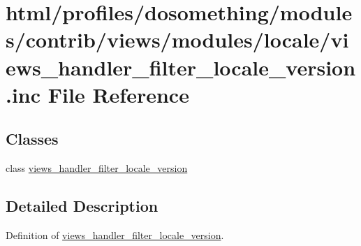 \hypertarget{views__handler__filter__locale__version_8inc}{
\section{html/profiles/dosomething/modules/contrib/views/modules/locale/views\_\-handler\_\-filter\_\-locale\_\-version.inc File Reference}
\label{views__handler__filter__locale__version_8inc}
}
\subsection*{Classes}
\begin{DoxyCompactItemize}
\item 
class \hyperlink{classviews__handler__filter__locale__version}{views\_\-handler\_\-filter\_\-locale\_\-version}
\end{DoxyCompactItemize}


\subsection{Detailed Description}
Definition of \hyperlink{classviews__handler__filter__locale__version}{views\_\-handler\_\-filter\_\-locale\_\-version}. 